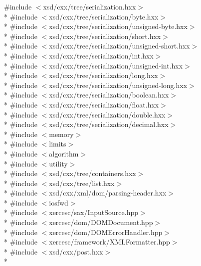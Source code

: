 {\ttfamily \#include $<$xsd/cxx/tree/serialization.\+hxx$>$}\\*
{\ttfamily \#include $<$xsd/cxx/tree/serialization/byte.\+hxx$>$}\\*
{\ttfamily \#include $<$xsd/cxx/tree/serialization/unsigned-\/byte.\+hxx$>$}\\*
{\ttfamily \#include $<$xsd/cxx/tree/serialization/short.\+hxx$>$}\\*
{\ttfamily \#include $<$xsd/cxx/tree/serialization/unsigned-\/short.\+hxx$>$}\\*
{\ttfamily \#include $<$xsd/cxx/tree/serialization/int.\+hxx$>$}\\*
{\ttfamily \#include $<$xsd/cxx/tree/serialization/unsigned-\/int.\+hxx$>$}\\*
{\ttfamily \#include $<$xsd/cxx/tree/serialization/long.\+hxx$>$}\\*
{\ttfamily \#include $<$xsd/cxx/tree/serialization/unsigned-\/long.\+hxx$>$}\\*
{\ttfamily \#include $<$xsd/cxx/tree/serialization/boolean.\+hxx$>$}\\*
{\ttfamily \#include $<$xsd/cxx/tree/serialization/float.\+hxx$>$}\\*
{\ttfamily \#include $<$xsd/cxx/tree/serialization/double.\+hxx$>$}\\*
{\ttfamily \#include $<$xsd/cxx/tree/serialization/decimal.\+hxx$>$}\\*
{\ttfamily \#include $<$memory$>$}\\*
{\ttfamily \#include $<$limits$>$}\\*
{\ttfamily \#include $<$algorithm$>$}\\*
{\ttfamily \#include $<$utility$>$}\\*
{\ttfamily \#include $<$xsd/cxx/tree/containers.\+hxx$>$}\\*
{\ttfamily \#include $<$xsd/cxx/tree/list.\+hxx$>$}\\*
{\ttfamily \#include $<$xsd/cxx/xml/dom/parsing-\/header.\+hxx$>$}\\*
{\ttfamily \#include $<$iosfwd$>$}\\*
{\ttfamily \#include $<$xercesc/sax/\+Input\+Source.\+hpp$>$}\\*
{\ttfamily \#include $<$xercesc/dom/\+D\+O\+M\+Document.\+hpp$>$}\\*
{\ttfamily \#include $<$xercesc/dom/\+D\+O\+M\+Error\+Handler.\+hpp$>$}\\*
{\ttfamily \#include $<$xercesc/framework/\+X\+M\+L\+Formatter.\+hpp$>$}\\*
{\ttfamily \#include $<$xsd/cxx/post.\+hxx$>$}\\*
